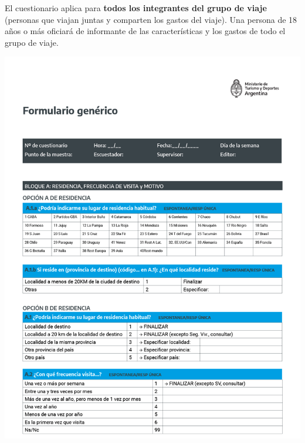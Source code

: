 \documentclass[
]{book}
\begin{document}
El cuestionario aplica para \textbf{todos los integrantes del grupo de viaje} (personas que viajan juntas y comparten los gastos del viaje).
Una persona de 18 años o más oficiará de informante de las características y los gastos de todo el grupo de viaje.

\begin{center}\includegraphics[width=1\linewidth]{imagenes/graf01} \end{center}
\end{document}
